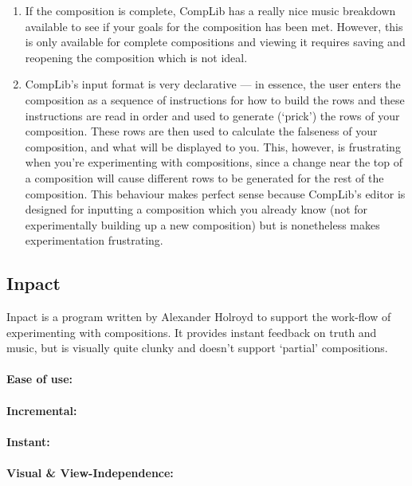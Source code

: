 \documentclass[12pt]{article}
\begin{document}
\begin{enumerate}
    \item If the composition is complete, CompLib has a really nice music breakdown available to see
        if your goals for the composition has been met.  However, this is only available for
        complete compositions and viewing it requires saving and reopening the composition which is
        not ideal.
    \item CompLib's input format is very declarative --- in essence, the user enters the composition
        as a sequence of instructions for how to build the rows and these instructions are read
        in order and used to generate (`prick') the rows of your composition.  These rows are then
        used to calculate the falseness of your composition, and what will be displayed to you.
        This, however, is frustrating when you're experimenting with compositions, since a change
        near the top of a composition will cause different rows to be generated for the rest of the
        composition.  This behaviour makes perfect sense because CompLib's editor is designed for
        inputting a composition which you already know (not for experimentally building up a new
        composition) but is nonetheless makes experimentation frustrating.
\end{enumerate}

\subsection{Inpact}

Inpact is a program written by Alexander Holroyd to support the work-flow of experimenting with
compositions.  It provides instant feedback on truth and music, but is visually quite clunky and
doesn't support `partial' compositions.

\paragraph{Ease of use:}

\paragraph{Incremental:}

\paragraph{Instant:}

\paragraph{Visual \& View-Independence:}
\end{document}
